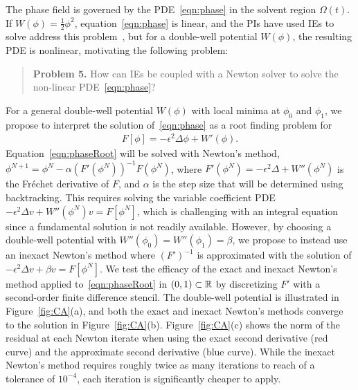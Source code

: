 The phase field is governed by the PDE~\eqref{eqn:phase} in the
solvent region $\Omega(t)$. If $W(\phi) = \tfrac{1}{2}\phi^2$,
equation~\eqref{eqn:phase} is linear, and the PIs have used IEs to solve
address this problem~\cite{Fu2018_SIAM, FuQuRyYo22,
fu-ryh-qua-you2022}, but for a double-well potential $W(\phi)$, the
resulting PDE is nonlinear, motivating the following problem:

\begin{quotation}
  \noindent
  \textbf{Problem 5.} How can IEs be coupled with a Newton solver to
  solve the non-linear PDE~\eqref{eqn:phase}?
\end{quotation}

For a general double-well potential $W(\phi)$ with local minima at
$\phi_0$ and $\phi_1$, we propose to interpret the solution
of~\eqref{eqn:phase} as a root finding problem for
\begin{align}
  \label{eqn:phaseRoot}
  F[\phi] = -\epsilon^2 \Delta \phi + W'(\phi).
\end{align}
Equation~\eqref{eqn:phaseRoot} will be solved with Newton's method,
$\phi^{N+1} = \phi^{N} - \alpha (F'(\phi^N))^{-1} F(\phi^N)$, where
$F'(\phi^N) = -\epsilon^2 \Delta + W''(\phi^N)$ is the
Fr\'{e}chet derivative of $F$, and $\alpha$ is the step size that will
be determined using backtracking. This requires solving the variable
coefficient PDE $-\epsilon^2 \Delta v + W''(\phi^{N}) v =
F[\phi^N]$, which is challenging with an integral equation since a
fundamental solution is not readily available. However, by choosing a
double-well potential with $W''(\phi_0) = W''(\phi_1) = \beta$, we
propose to instead use an inexact Newton's method where $(F')^{-1}$ is
approximated with the solution of $-\epsilon^2 \Delta v +
\beta v = F[\phi^N]$. We test the efficacy of the exact and
inexact Newton's method applied to~\eqref{eqn:phaseRoot} in $(0,1)
\subset \mathbb{R}$ by discretizing $F'$ with a second-order finite difference
stencil. The double-well potential is illustrated in
Figure~\ref{fig:CA}(a), and both the exact and inexact Newton's methods
converge to the solution in Figure~\ref{fig:CA}(b).
Figure~\ref{fig:CA}(c) shows the norm of the residual at each Newton
iterate when using the exact second derivative (red curve) and the
approximate second derivative (blue curve). While the inexact Newton's
method requires roughly twice as many iterations to reach of a tolerance
of $10^{-4}$, each iteration is significantly cheaper to apply.

